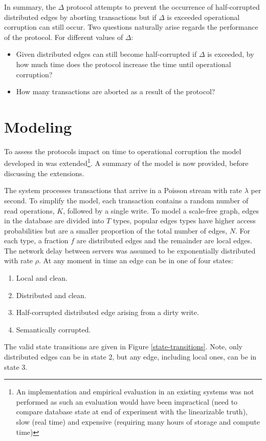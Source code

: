 \documentclass[sigplan,10pt]{acmart}
\begin{document}
In summary, the $\Delta$ protocol attempts to prevent the occurrence of half-corrupted distributed edges by aborting transactions but if $\Delta$ is exceeded operational corruption can still occur. Two questions naturally arise regards the performance of the protocol. For different values of $\Delta$:
\begin{itemize}
\item Given distributed edges can still become half-corrupted if $\Delta$ is exceeded, by how much time does the protocol increase the time until operational corruption?
\item How many transactions are aborted as a result of the protocol?
\end{itemize}

\section{Modeling}
\label{sec:modeling}

To assess the protocols impact on time to operational corruption the model developed in \cite{Ezhilchelvan2018} was extended\footnote{An implementation and empirical evaluation in an existing systems was not performed as such an evaluation would have been impractical (need to compare database state at end of experiment with the linearizable truth), slow (real time) and expensive (requiring many hours of storage and compute time)}. A summary of the model is now provided, before discussing the extensions.

The system processes transactions that arrive in a Poisson stream with rate $\lambda$ per second. To simplify the model, each transaction contains a random number of read operations, $K$, followed by a single write. To model a scale-free graph, edges in the database are divided into $T$ types, popular edges types have higher access probabilities but are a smaller proportion of the total number of edges, $N$. For each type, a fraction $f$ are distributed edges and the remainder are local edges. The network delay between servers was assumed to be exponentially distributed with rate $\rho$. At any moment in time an edge can be in one of four states:
\begin{enumerate}
\item Local and clean.
\item Distributed and clean.
\item Half-corrupted distributed edge arising from a dirty write.
\item Semantically corrupted.
\end{enumerate}
The valid state transitions are given in Figure \ref{state-transitions}. Note, only distributed edges can be in state 2, but any edge, including local ones, can be in state 3.
\end{document}
